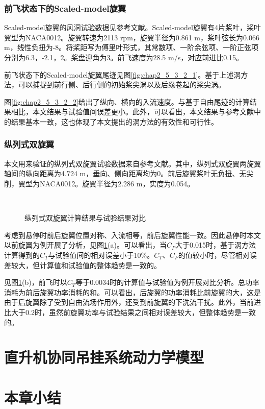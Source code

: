\subsubsection{前飞状态下的Scaled-model旋翼}
Scaled-model旋翼的风洞试验数据见参考文献\cite{elliott1988inflow}。Scaled-model旋翼有4片桨叶，桨叶翼型为NACA0012。旋翼转速为2113 rpm，旋翼半径为0.861 m，桨叶弦长为0.066 m，线性负扭为-8\degree。将桨距写为傅里叶形式，其常数项、一阶余弦项、一阶正弦项分别为6.3\degree，-2.1\degree，2\degree。桨盘迎角为3\degree。前飞速度为28.5 m/s，对应前进比0.15。

前飞状态下的Scaled-model旋翼尾迹见图\ref{fig:chap2_5_3_2_1}。基于上述涡方法，可以捕捉到前行侧、后行侧的初始桨尖涡以及后缘卷起的桨尖涡。

图\ref{fig:chap2_5_3_2_2}给出了纵向、横向的入流速度。与基于自由尾迹的计算结果\cite{bhagwat2001transient}相比，本文结果与试验值间误差更小。此外，可以看出，本文结果与参考文献\cite{tan2013simulating}中的结果基本一致，这也体现了本文提出的涡方法的有效性和可行性。

\subsubsection{纵列式双旋翼}
本文用来验证的纵列式双旋翼试验数据来自参考文献\cite{dingeldein1954wind}。其中，纵列式双旋翼两旋翼轴间的纵向距离为4.724 m，垂向、侧向距离均为0。前后旋翼桨叶无负扭、无尖削，翼型为NACA0012。旋翼半径为2.286 m，实度为0.054。
\begin{figure}[!htb]  
  \quad
    \\
    \caption{纵列式双旋翼计算结果与试验结果对比}
    \label{fig:chap2_5_3_3_1}
\end{figure}

考虑到悬停时前后旋翼位置对称、入流相等，前后旋翼性能一致。因此悬停时本文以前旋翼为例开展了分析，见图\ref{fig:chap2_5_3_3_1}(a)。可以看出，当$C_P$大于0.015时，基于涡方法计算得到的$C_T$与试验值间的相对误差小于10\%。$C_T$、$C_P$的值较小时，尽管相对误差较大，但计算值和试验值的整体趋势是一致的。

见图\ref{fig:chap2_5_3_3_1}(b)，前飞时以$C_T$等于0.0034时的计算值与试验值为例开展对比分析。总功率消耗为前后旋翼功率消耗的和。可以看出，后旋翼的功率消耗比前旋翼的大，这是由于后旋翼除了受到自由流场作用外，还受到前旋翼的下洗流干扰。此外，当前进比大于0.2时，虽然前旋翼功率与试验结果之间相对误差较大，但整体趋势是一致的。

\section{直升机协同吊挂系统动力学模型}

\section{本章小结}